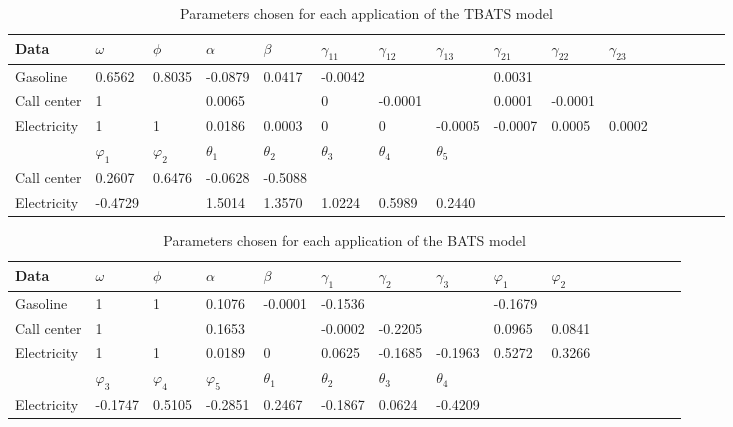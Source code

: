 \documentclass{uwstat572}
\begin{document}
\begin{table}[]
\small
\centering
\caption{Parameters chosen for each application of the TBATS model}
\label{table:TBATS}
\begin{tabular}{l l l l l l l l l l l l l l l l}
\hline \hline
Data &$\omega$ & $\phi$ & $\alpha$  & $\beta$ & $\gamma_{11}$ & $\gamma_{12}$ & $\gamma_{13}$ & $\gamma_{21}$ & $\gamma_{22}$ & $\gamma_{23}$  \\
\hline
Gasoline &0.6562 & 0.8035 & -0.0879& 0.0417 & -0.0042 &          &   &  0.0031    &           &               \\ 
Call center &1 &   & 0.0065 &         & 0 & -0.0001 & &   0.0001     &  -0.0001 &                   \\
Electricity & 1 & 1 & 0.0186 & 0.0003       & 0  & 0 & -0.0005 &  -0.0007  & 0.0005 & 0.0002 \\ \hline
 & $\varphi_1$ & $\varphi_2$  & $\theta_1$ & $\theta_2$ &  $\theta_3$ &$\theta_4$ &  $\theta_5$\\
 Call center  &0.2607  &  0.6476  & -0.0628   & -0.5088    \\
Electricity & -0.4729 & & 1.5014 &   1.3570   & 1.0224  &  0.5989 &   0.2440     \\ \hline \hline
\end{tabular}
\end{table}



\begin{table}[]
\small
\centering
\caption{Parameters chosen for each application of the BATS model}
\label{table:BATS}
\begin{tabular}{l l l l l l l l l l l l l l l l}
\hline \hline
Data &$\omega$ & $\phi$ & $\alpha$  & $\beta$ & $\gamma_1$ & $\gamma_2$ & $\gamma_3$ &  $\varphi_1$ & $\varphi_2$ \\
\hline
Gasoline &1 & 1 & 0.1076 & -0.0001 & -0.1536 &         &         &          -0.1679 &               \\ 
Call center &1 &   & 0.1653 &         & -0.0002 & -0.2205 &         &             0.0965  & 0.0841         \\
Electricity & 1 & 1 & 0.0189 & 0       & 0.0625  & -0.1685 & -0.1963 &  0.5272  & 0.3266 \\ \hline
 &$\varphi_3$&$\varphi_4$&$\varphi_5$ & $\theta_1$ & $\theta_2$ &  $\theta_3$ &$\theta_4$ &  \\
Electricity &  -0.1747 & 0.5105 & -0.2851&0.2467 & -0.1867 & 0.0624 & -0.4209    \\ \hline \hline
\end{tabular}
\end{table}
\end{document}
